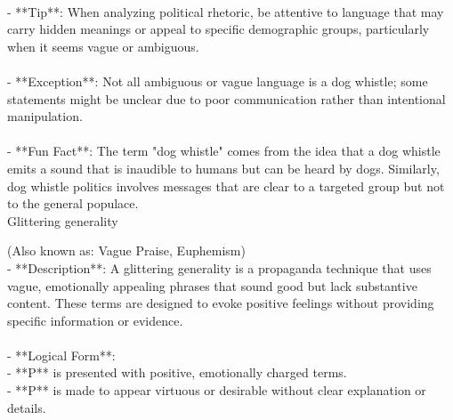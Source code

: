 \documentclass[a4paper,12pt,single,pdftex]{scrbook}
\begin{document}
    
      
    \\

    
      - **Tip**: When analyzing political rhetoric, be attentive to language that may carry hidden meanings or appeal to specific demographic groups, particularly when it seems vague or ambiguous.
    \\

    
      
    \\

    
      - **Exception**: Not all ambiguous or vague language is a dog whistle; some statements might be unclear due to poor communication rather than intentional manipulation.
    \\

    
      
    \\

    
      - **Fun Fact**: The term "dog whistle" comes from the idea that a dog whistle emits a sound that is inaudible to humans but can be heard by dogs. Similarly, dog whistle politics involves messages that are clear to a targeted group but not to the general populace.
    \\

  

Glittering generality
    
      (Also known as: Vague Praise, Euphemism)
    \\

  
    
      - **Description**: A glittering generality is a propaganda technique that uses vague, emotionally appealing phrases that sound good but lack substantive content. These terms are designed to evoke positive feelings without providing specific information or evidence.
    \\

    
      
    \\

    
      - **Logical Form**:
    \\

    
        - **P** is presented with positive, emotionally charged terms.
    \\

    
        - **P** is made to appear virtuous or desirable without clear explanation or details.
    \\
\end{document}
